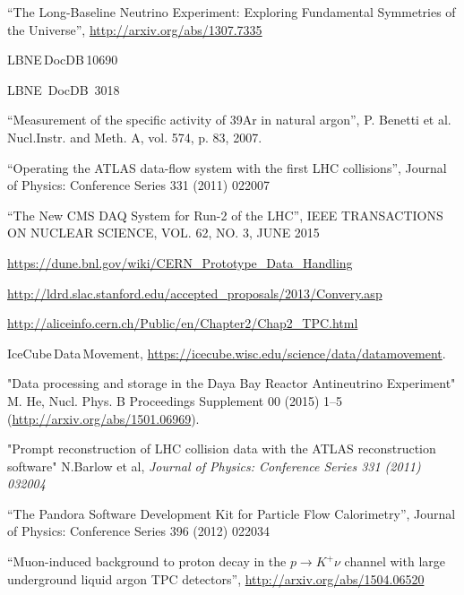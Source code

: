 \begin{thebibliography}{99}

 ``The Long-Baseline Neutrino Experiment: Exploring Fundamental Symmetries of the Universe'',  \url{http://arxiv.org/abs/1307.7335}

 LBNE\,DocDB\,10690  %

 LBNE~DocDB~3018%

 ``Measurement of the specific activity of 39Ar in natural argon'', P. Benetti et al. Nucl.Instr. and Meth. A, vol. 574, p. 83, 2007.

 ``Operating the ATLAS data-flow system with the first LHC collisions'', Journal of Physics: Conference Series 331 (2011) 022007

 ``The New CMS DAQ System for Run-2 of the LHC'', IEEE TRANSACTIONS ON NUCLEAR SCIENCE, VOL. 62, NO. 3, JUNE 2015

 \url{https://dune.bnl.gov/wiki/CERN_Prototype_Data_Handling}

 \url{http://ldrd.slac.stanford.edu/accepted_proposals/2013/Convery.asp}

 \url{http://aliceinfo.cern.ch/Public/en/Chapter2/Chap2_TPC.html}

 IceCube\,Data\,Movement, \url{https://icecube.wisc.edu/science/data/datamovement}.

"Data processing and storage in the Daya Bay Reactor Antineutrino Experiment" M. He, Nucl. Phys. B Proceedings Supplement 00 (2015) 1–5 (\url{http://arxiv.org/abs/1501.06969}).

 "Prompt reconstruction of LHC collision data with the ATLAS reconstruction software" N.Barlow et al, \textit{Journal of Physics: Conference Series 331 (2011) 032004}

 ``The Pandora Software Development Kit for Particle Flow Calorimetry'', Journal of Physics: Conference Series 396 (2012) 022034

 ``Muon-induced background to proton decay in the $p \rightarrow K^+\nu$ channel with large underground liquid argon TPC detectors'', \url{http://arxiv.org/abs/1504.06520}

\end{thebibliography}